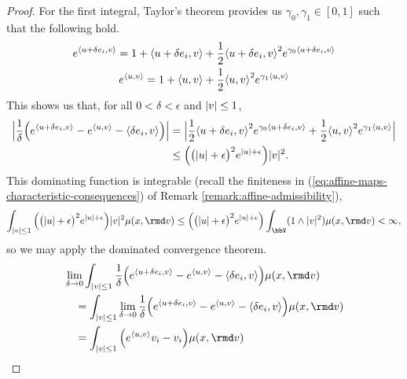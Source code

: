 \begin{proof}
  For the first integral, Taylor's theorem provides us $\gamma_0, \gamma_1 \in [0,1]$ such that the following hold.
  \begin{gather*}
    e^{\langle u+\delta e_i , v \rangle} = 1 + {\langle u+\delta e_i , v \rangle} + \frac12 {\langle u+\delta e_i , v \rangle}^2 e^{\gamma_0{\langle u+\delta e_i , v \rangle}} \\
    e^{\langle u , v \rangle} = 1 + {\langle u , v \rangle} + \frac12 {\langle u , v \rangle}^2 e^{\gamma_1{\langle u , v \rangle}}
  \end{gather*}
  This shows us that, for all $0 < \delta < \epsilon$ and $|v| \leq 1$,
  \begin{align*}
    \Big| \frac1\delta \Big( e^{\langle u+\delta e_i , v \rangle} - e^{\langle u , v \rangle} - {\langle \delta e_i , v \rangle} \Big) \Big|
    &= \Big| \frac{1}{2} {\langle u+\delta e_i , v \rangle}^2 e^{\gamma_0{\langle u+\delta e_i , v \rangle}} + \frac12{\langle u , v \rangle}^2 e^{\gamma_1{\langle u , v \rangle}} \Big| \\
    &\leq \Big(\big(|u| + \epsilon\big)^2 e^{|u|+\epsilon} \Big) |v|^2.
  \end{align*}
  This dominating function is integrable (recall the finiteness in (\ref{eq:affine-maps-characteristic-consequences}) of Remark \ref{remark:affine-admissibility}),
  \begin{equation*}
    \int_{|\markVar|\leq 1} \Big( \big(|\momentVar|+\epsilon\big)^2 e^{|\momentVar|+\epsilon} \Big) |\markVar|^2 \affJump(\stateVar,\rmd\markVar)
    \leq  \Big( \big(|\momentVar|+\epsilon\big)^2 e^{|\momentVar|+\epsilon} \Big) \int_\vecSpace (1 \wedge |\markVar|^2) \affJump(\stateVar,\rmd\markVar) < \infty,
  \end{equation*}
  so we may apply the dominated convergence theorem.
  \begin{align}
    &\lim_{\delta \rightarrow 0} \int_{|\markVar|\leq 1} \frac1\delta \Big( e^\prj{\momentVar+\delta \basisVec_i}{\markVar} - e^\prj{\momentVar}{\markVar} - \prj{\delta \basisVec_i}{\markVar} \Big) \affJump(\stateVar,\rmd\markVar) \notag \\
    &\quad= \int_{|\markVar|\leq 1} \lim_{\delta\rightarrow0} \frac{1}{\delta} \Big( e^\prj{\momentVar+\delta \basisVec_i}{\markVar} - e^\prj{\momentVar}{\markVar} - \prj{\delta \basisVec_i}{\markVar} \Big) \affJump(\stateVar,\rmd\markVar) \notag \\
    \label{eq:dct1}
    &\quad= \int_{|\markVar|\leq1} \Big( e^\prj{\momentVar}{\markVar} \markVar_i - \markVar_i \Big) \affJump(\stateVar,\rmd\markVar)
  \end{align}


\end{proof}

